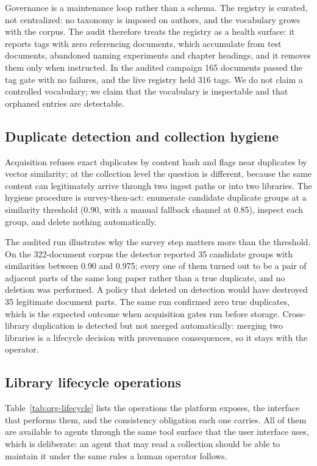Governance is a maintenance loop rather than a schema. The registry is
curated, not centralized: no taxonomy is imposed on authors, and the
vocabulary grows with the corpus. The audit therefore treats the registry as
a health surface: it reports tags with zero referencing documents, which
accumulate from test documents, abandoned naming experiments and chapter
headings, and it removes them only when instructed. In the audited campaign
165 documents passed the tag gate with no failures, and the live registry
held 316 tags. We do not claim a controlled vocabulary; we claim that the
vocabulary is inspectable and that orphaned entries are detectable.

\subsection{Duplicate detection and collection hygiene}
\label{sec:org-dedup}

Acquisition refuses exact duplicates by content hash and flags near
duplicates by vector similarity; at the collection level the question is
different, because the same content can legitimately arrive through two
ingest paths or into two libraries. The hygiene procedure is
survey-then-act: enumerate candidate duplicate groups at a similarity
threshold (0.90, with a manual fallback channel at 0.85), inspect each group,
and delete nothing automatically.

The audited run illustrates why the survey step matters more than the
threshold. On the 322-document corpus the detector reported 35 candidate
groups with similarities between 0.90 and 0.975; every one of them turned out
to be a pair of adjacent parts of the same long paper rather than a true
duplicate, and no deletion was performed. A policy that deleted on detection
would have destroyed 35 legitimate document parts. The same run confirmed
zero true duplicates, which is the expected outcome when acquisition gates
run before storage. Cross-library duplication is detected but not merged
automatically: merging two libraries is a lifecycle decision with provenance
consequences, so it stays with the operator.

\subsection{Library lifecycle operations}
\label{sec:org-lifecycle}

Table~\ref{tab:org-lifecycle} lists the operations the platform exposes, the
interface that performs them, and the consistency obligation each one
carries. All of them are available to agents through the same tool surface
that the user interface uses, which is deliberate: an agent that may read a
collection should be able to maintain it under the same rules a human
operator follows.

